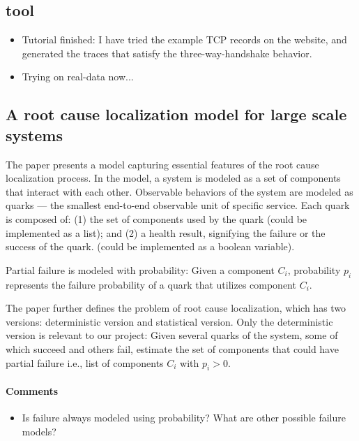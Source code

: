 \documentclass{article}
\begin{document}
\subsection{\saf tool}
\label{sec:saftool}

\begin{itemize}
\item Tutorial finished: I have tried the example TCP records on the \saf
  website, and generated the traces that satisfy the three-way-handshake
  behavior.
\item Trying \saf on real-data now...
\end{itemize}

\subsection{A root cause localization model for large scale systems}
\label{sec:rootcause}

The paper presents a model capturing essential features of the root cause
localization process. In the model, a system is modeled as a set of components
that interact with each other. Observable behaviors of the system are modeled as
quarks --- the smallest end-to-end observable unit of specific service. Each
quark is composed of:
(1) the set of components used by the quark (could be implemented as a list); and
(2) a health result, signifying the failure or the success of the quark. (could
be implemented as a boolean variable).

Partial failure is modeled with probability: Given a component $C_i$,
probability $p_i$ represents the failure probability of a quark that utilizes
component $C_i$.

The paper further defines the problem of root cause localization, which has two
versions: deterministic version and statistical version. Only the deterministic
version is relevant to our project: Given several quarks of the system, some of
which succeed and others fail, estimate the set of components that could have partial
failure i.e., list of components $C_i$ with $p_i > 0$.

\paragraph{Comments}

\begin{itemize}
\item Is failure always modeled using probability? What are other possible
  failure models?
\end{itemize}


{}

\end{document}
